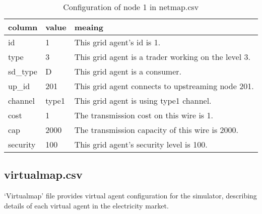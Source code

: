 \documentclass[12pt]{article}
\begin{document}
\begin{table}[H]
    \caption{Configuration of node 1 in netmap.csv}
    \begin{center}
        \begin{tabular} {| l | l | l |}
            \hline
            \textbf{column} & \textbf{value} & \textbf{meaing} \\ \hline
            id & 1 & This grid agent's id is 1. \\ \hline
            type & 3 & This grid agent is a trader working on the level 3. \\ \hline
            sd\_type & D & This grid agent is a consumer. \\ \hline
            up\_id & 201 & This grid agent connects to upstreaming node 201. \\ \hline
            channel & type1 & This grid agent is using type1 channel. \\ \hline
            cost & 1 & The transmission cost on this wire is 1. \\ \hline
            cap & 2000 & The transmission capacity of this wire is 2000. \\ \hline
            security & 100 & This grid agent's security level is 100. \\ \hline
        \end{tabular}
    \end{center}
\end{table}

\subsection{virtualmap.csv}
\label{subsec:input_virtualmap}

`Virtualmap' file provides virtual agent configuration for the simulator, 
describing details of each virtual agent in the electricity market. 
\end{document}
